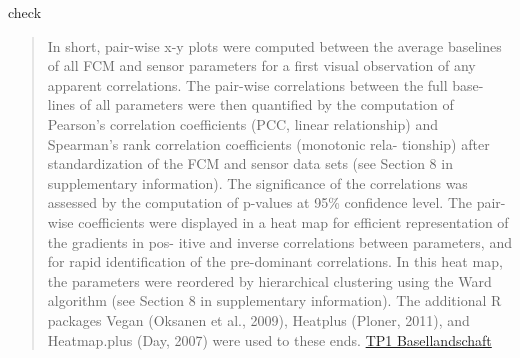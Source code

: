\documentclass[8pt,ignorenonframetext,]{beamer}
\begin{document}
\begin{frame}{check}

\begin{quote}
In short, pair-wise x-y plots were computed between the average
baselines of all FCM and sensor parameters for a first visual
observation of any apparent correlations. The pair-wise correlations
between the full base- lines of all parameters were then quantified by
the computation of Pearson's correlation coefficients (PCC, linear
relationship) and Spearman's rank correlation coefficients (monotonic
rela- tionship) after standardization of the FCM and sensor data sets
(see Section 8 in supplementary information). The significance of the
correlations was assessed by the computation of p-values at 95\%
confidence level. The pair-wise coefficients were displayed in a heat
map for efficient representation of the gradients in pos- itive and
inverse correlations between parameters, and for rapid identification of
the pre-dominant correlations. In this heat map, the parameters were
reordered by hierarchical clustering using the Ward algorithm (see
Section 8 in supplementary information). The additional R packages Vegan
(Oksanen et al., 2009), Heatplus (Ploner, 2011), and Heatmap.plus (Day,
2007) were used to these ends.
\href{https://www.baselland.ch/politik-und-behorden/direktionen/bau-und-umweltschutzdirektion/umweltschutz-energie/wasser/wasserversorgung/publikationen/downloads/tp1-karstsysteme.pdf}{TP1
Basellandschaft}
\end{quote}

\end{frame}
\end{document}
